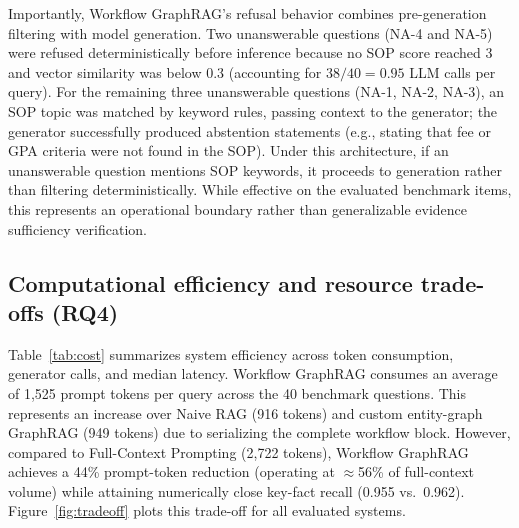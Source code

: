\documentclass[preprint,10pt]{elsarticle}
\begin{document}
Importantly, Workflow GraphRAG's refusal behavior combines pre-generation filtering with model generation. Two unanswerable questions (NA-4 and NA-5) were refused deterministically before inference because no SOP score reached 3 and vector similarity was below 0.3 (accounting for $38/40 = 0.95$ LLM calls per query). For the remaining three unanswerable questions (NA-1, NA-2, NA-3), an SOP topic was matched by keyword rules, passing context to the generator; the generator successfully produced abstention statements (e.g., stating that fee or GPA criteria were not found in the SOP). Under this architecture, if an unanswerable question mentions SOP keywords, it proceeds to generation rather than filtering deterministically. While effective on the evaluated benchmark items, this represents an operational boundary rather than generalizable evidence sufficiency verification.

\subsection{Computational efficiency and resource trade-offs (RQ4)}
Table~\ref{tab:cost} summarizes system efficiency across token consumption, generator calls, and median latency. Workflow GraphRAG consumes an average of 1,525 prompt tokens per query across the 40 benchmark questions. This represents an increase over Naive RAG (916 tokens) and custom entity-graph GraphRAG (949 tokens) due to serializing the complete workflow block. However, compared to Full-Context Prompting (2,722 tokens), Workflow GraphRAG achieves a 44\% prompt-token reduction (operating at $\approx$56\% of full-context volume) while attaining numerically close key-fact recall (0.955 vs.\ 0.962).
Figure~\ref{fig:tradeoff} plots this trade-off for all evaluated systems.
\end{document}
